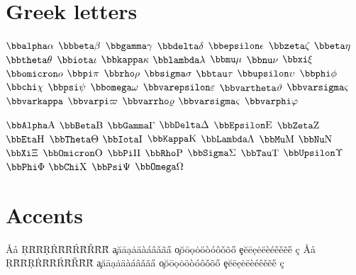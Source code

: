 \section{Greek letters}

$\bbalpha\alpha$
$\bbbeta\beta$
$\bbgamma\gamma$ $\bbdelta\delta$ $\bbepsilon\epsilon$
$\bbzeta\zeta$ $\bbeta\eta$ $\bbtheta\theta$
$\bbiota\iota$ $\bbkappa\kappa$ $\bblambda\lambda$
$\bbmu\mu$ $\bbnu\nu$ $\bbxi\xi$ $\bbomicron o$
$\bbpi\pi$ $\bbrho\rho$ $\bbsigma\sigma$ $\bbtau\tau$
$\bbupsilon\upsilon$ $\bbphi\phi$ $\bbchi\chi$ $\bbpsi\psi$
$\bbomega\omega$ $\bbvarepsilon\varepsilon$ $\bbvartheta\vartheta$
$\bbvarsigma\varsigma$ $\bbvarkappa$%
$\bbvarpi\varpi$
$\bbvarrho\varrho$ $\bbvarsigma\varsigma$ $\bbvarphi\varphi$
\par\let\machin=\rm
$\bbAlpha\machin A$ $\bbBeta\machin B$
$\bbGamma\machin\Gamma$
$\bbDelta\machin\Delta$ $\bbEpsilon\machin\rm E$ $\bbZeta\machin Z$
$\bbEta\machin H$ $\bbTheta\machin\Theta$ $\bbIota\machin I$
$\bbKappa\machin K$ $\bbLambda\machin\Lambda$ $\bbMu\machin M$
$\bbNu\machin N$ $\bbXi\machin\Xi$ $\bbOmicron\machin O$
$\bbPi\machin\Pi$ $\bbRho\machin P$ $\bbSigma\machin\Sigma$
$\bbTau\machin T$ $\bbUpsilon\machin\Upsilon$ $\bbPhi\machin\Phi$
$\bbChi\machin X$ $\bbPsi\machin\Psi$ $\bbOmega\machin\Omega$

\section{Accents}

{\mbb
\AA\aa
\c R\u R\=R\d R\.R\"R\`R\'R\^R\v R\~R\H R
\c a\u a\=a\d a\.a\"a\`a\'a\^a\v a\~a\H a
\c o\u o\=o\d o\.o\"o\`o\'o\^o\v o\~o\H o
\c e\u e\=e\d e\.e\"e\`e\'e\^e\v e\~e\H e
\c c}
\medbreak
{\rm\AA\aa
\c R\u R\=R\d R\.R\"R\`R\'R\^R\v R\~R\H R
\c a\u a\=a\d a\.a\"a\`a\'a\^a\v a\~a\H a
\c o\u o\=o\d o\.o\"o\`o\'o\^o\v o\~o\H o
\c e\u e\=e\d e\.e\"e\`e\'e\^e\v e\~e\H e
\c c}








